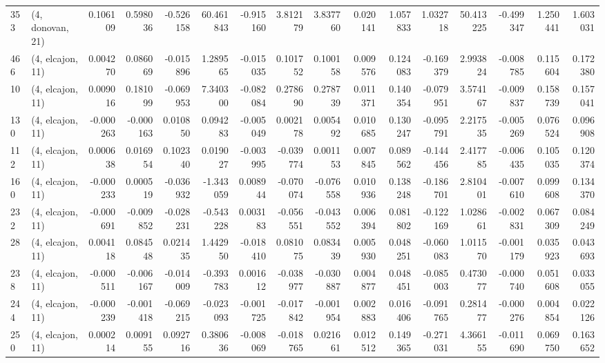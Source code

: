 \begin{tabular}{llrrrrrrrrrrrrrr}
353 &  (4, donovan, 21) &   0.106109 &  0.598036 & -0.526158 &   60.461843 & -0.915160 &   3.812179 &   3.837760 &  0.020141 &  1.057833 &  1.032718 &   50.413225 & -0.499347 &   1.250441 &   1.603031 \\
466 &  (4, elcajon, 11) &   0.004270 &  0.086069 & -0.015896 &    1.289565 & -0.015035 &   0.101752 &   0.100158 &  0.009576 &  0.124083 & -0.169379 &    2.993824 & -0.008785 &   0.115604 &   0.172380 \\
10  &  (4, elcajon, 11) &   0.009016 &  0.181099 & -0.069953 &    7.340300 & -0.082084 &   0.278690 &   0.278739 &  0.011371 &  0.140354 & -0.079951 &    3.574167 & -0.009837 &   0.158739 &   0.157041 \\
130 &  (4, elcajon, 11) &  -0.000263 & -0.000163 &  0.010850 &    0.094283 & -0.005049 &   0.002178 &   0.005492 &  0.010685 &  0.130247 & -0.095791 &    2.217535 & -0.005269 &   0.076524 &   0.096908 \\
112 &  (4, elcajon, 11) &   0.000638 &  0.016954 &  0.102340 &    0.019027 & -0.003995 &  -0.039774 &   0.001153 &  0.007845 &  0.089562 & -0.144456 &    2.417785 & -0.006435 &   0.105035 &   0.120374 \\
160 &  (4, elcajon, 11) &  -0.000233 &  0.000519 & -0.036932 &   -1.343059 &  0.008944 &  -0.070074 &  -0.076558 &  0.010936 &  0.138248 & -0.186701 &    2.810401 & -0.007610 &   0.099608 &   0.134370 \\
232 &  (4, elcajon, 11) &  -0.000691 & -0.009852 & -0.028231 &   -0.543228 &  0.003183 &  -0.056551 &  -0.043552 &  0.006394 &  0.081802 & -0.122169 &    1.028661 & -0.002831 &   0.067309 &   0.084249 \\
28  &  (4, elcajon, 11) &   0.004118 &  0.084548 &  0.021435 &    1.442950 & -0.018410 &   0.081075 &   0.083439 &  0.005930 &  0.048251 & -0.060083 &    1.011570 & -0.001179 &   0.035923 &   0.043693 \\
238 &  (4, elcajon, 11) &  -0.000511 & -0.006167 & -0.014009 &   -0.393783 &  0.001612 &  -0.038977 &  -0.030887 &  0.004877 &  0.048451 & -0.085003 &    0.473077 & -0.000740 &   0.051608 &   0.033055 \\
244 &  (4, elcajon, 11) &  -0.000239 & -0.001418 & -0.069215 &   -0.023093 & -0.001725 &  -0.017842 &  -0.001954 &  0.002883 &  0.016406 & -0.091765 &    0.281477 & -0.000276 &   0.004854 &   0.022126 \\
250 &  (4, elcajon, 11) &   0.000214 &  0.009155 &  0.092716 &    0.380636 & -0.008069 &  -0.018765 &   0.021661 &  0.012512 &  0.149365 & -0.271031 &    4.366155 & -0.011690 &   0.069750 &   0.163652 \\

\end{tabular}
